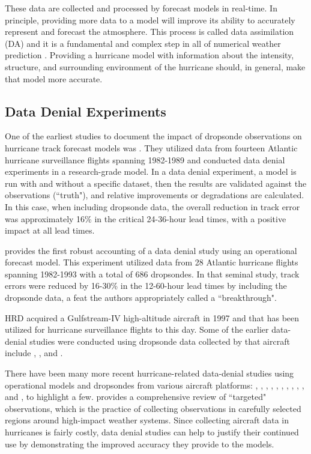 \documentclass[12pt]{article}%
\begin{document}
These data are collected and processed by forecast models in real-time. In principle, providing more data to a model will improve its ability to accurately represent and forecast the atmosphere. This process is called data assimilation (DA) and it is a fundamental and complex step in all of numerical weather prediction \citep{Kalnay2003, Bannister2017}. Providing a hurricane model with information about the intensity, structure, and surrounding environment of the hurricane should, in general, make that model more accurate.

\subsection{Data Denial Experiments}

One of the earliest studies to document the impact of dropsonde observations on hurricane track forecast models was \citet{Franklin_DeMaria1992}. They utilized data from fourteen Atlantic hurricane surveillance flights spanning 1982-1989 and conducted data denial experiments in a research-grade model. In a data denial experiment, a model is run with and without a specific dataset, then the results are validated against the observations (``truth"), and relative improvements or degradations are calculated. In this case, when including dropsonde data, the overall reduction in track error was approximately 16\% in the critical 24-36-hour lead times, with a positive impact at all lead times.

\citet{BurpeeEA1996} provides the first robust accounting of a data denial study using an operational forecast model. This experiment utilized data from 28 Atlantic hurricane flights spanning 1982-1993 with a total of 686 dropsondes. In that seminal study, track errors were reduced by 16-30\% in the 12-60-hour lead times by including the dropsonde data, a feat the authors appropriately called a ``breakthrough".

HRD acquired a Gulfstream-IV high-altitude aircraft in 1997 and that has been utilized for hurricane surveillance flights to this day. Some of the earlier data-denial studies were conducted using dropsonde data collected by that aircraft include \citet{Aberson_Franklin1999}, \citet{Aberson2002}, and \citet{Aberson2010}. 

There have been many more recent hurricane-related data-denial studies using operational models and dropsondes from various aircraft platforms: \citet{Aberson2011}, \citet{ChouEA2011}, \citet{MajumdarEA2013}, \citet{ChristophersonEA2017}, \citet{ChristophersonEA2018}, \citet{KrenEA2018}, \citet{TongEA2018}, \citet{AksoyEA2022}, \citet{SippelEA2022}, \citet{DitchekEA2023}, and \citet{SippelEA2026}, to highlight a few. \citet{Majumdar2016} provides a comprehensive review of ``targeted" observations, which is the practice of collecting observations in carefully selected regions around high-impact weather systems. Since collecting aircraft data in hurricanes is fairly costly, data denial studies can help to justify their continued use by demonstrating the improved accuracy they provide to the models.
\end{document}
